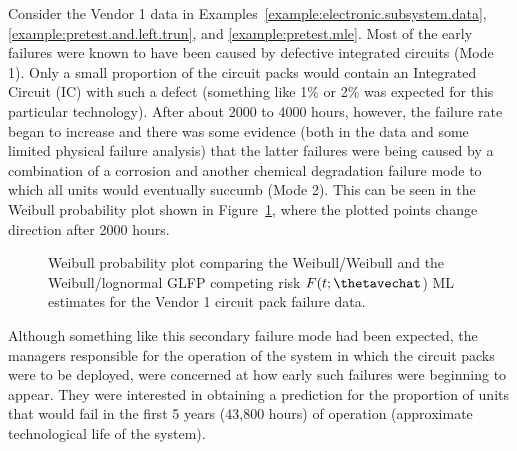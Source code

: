 Consider the Vendor 1
data in Examples~\ref{example:electronic.subsystem.data},
\ref{example:pretest.and.left.trun}, and \ref{example:pretest.mle}. 
Most of the early failures were known to have been caused by
defective integrated circuits (Mode 1). Only a small proportion of the
circuit packs would contain an Integrated Circuit (IC) with such a
defect (something like 1\% or 2\% was expected for this particular
technology).  After about 2000 to 4000 hours, however, the failure
rate began to increase and there was some evidence (both in the data
and some limited physical failure analysis) that the latter failures
were being caused by a combination of a corrosion and another
chemical degradation failure mode to which all units would
eventually succumb (Mode 2).  This can be seen in the Weibull probability
plot shown in Figure~\ref{figure:vendor1.cdf.ps}, where the plotted
points change direction after 2000 hours.
\begin{figure}
\caption{Weibull probability plot comparing the Weibull/Weibull and the
Weibull/lognormal GLFP competing risk $F(t;\thetavechat$) ML estimates for the
Vendor 1 circuit pack failure data.}
\label{figure:vendor1.cdf.ps}
\end{figure}
Although something like this secondary failure mode had been
expected, the managers responsible for the operation of the system
in which the circuit packs were to be deployed, were concerned at
how early such failures were beginning to appear. They were
interested in obtaining a prediction for the proportion of units
that would fail in the first 5 years (43,800 hours) of operation
(approximate technological life of the system).

